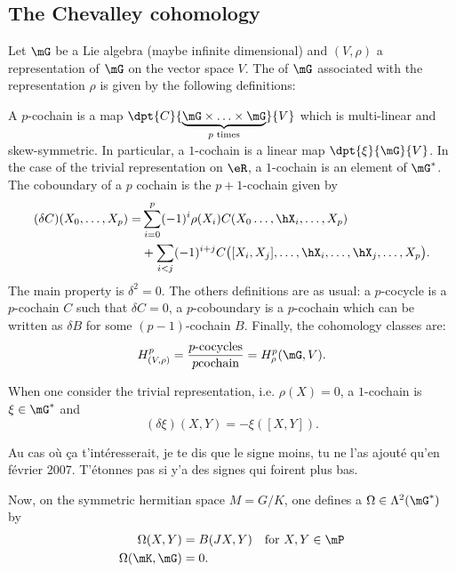 \subsection{The Chevalley cohomology}

Let $\mG$ be a Lie algebra (maybe infinite dimensional) and $(V,\rho)$ a representation of $\mG$ on the vector space $V$. The  of $\mG$ associated with the representation $\rho$ is given by the following definitions:

A $p$-cochain is a map $\dpt{C}{\underbrace{\mG\times\ldots\times\mG}_{p \text{ times}}}{V}$ which is multi-linear and skew-symmetric. In particular, a $1$-cochain is a linear map $\dpt{\xi}{\mG}{V}$. In the case of the trivial representation on $\eR$, a $1$-cochain is an element of $\mG^*$. The coboundary of a $p$ cochain is the $p+1$-cochain given by
\begin{equation}
	\begin{split}
		(\delta C)(X_0,\ldots,X_p)=&\sum_{i=0}^{p}(-1)^i\rho(X_i)C(X_0\ldots,\hX_i,\ldots,X_p)\\
		&+\sum_{i<j}(-1)^{i+j}C\big(  [X_i,X_j],\ldots,\hX_i,\ldots,\hX_j,\ldots,X_p \big).
	\end{split}
\end{equation}
The main property is $\delta^2=0$. The others definitions are as usual: a $p$-cocycle is a $p$-cochain $C$ such that $\delta C=0$, a $p$-coboundary is a $p$-cochain which can be written as $\delta B$ for some  $(p-1)$-cochain $B$. Finally, the cohomology classes are:
\begin{equation}
	H^{p}_{(V,\rho)}=\frac{p\text{-cocycles}}{p\text{cochain}}=H^p_{\rho}(\mG,V).
\end{equation}

When one consider the trivial representation, i.e. $\rho(X)=0$, a $1$-cochain is $\xi\in\mG^*$ and
\begin{equation}  \label{EqDefcochaintrivC}
	(\delta\xi)(X,Y)=-\xi([X,Y]).
\end{equation}

\begin{probleme}
	Au cas où ça t'intéresserait, je te dis que le signe moins, tu ne l'as ajouté qu'en février 2007. T'étonnes pas si y'a des signes qui foirent plus bas.
\end{probleme}

Now, on the symmetric hermitian space $M=G/K$, one defines a $\Omega\in\Lambda^2(\mG^*)$ by
\begin{subequations}
	\begin{align}
		\Omega(X,Y)     & =B(JX,Y)                                            & \text{for }X,Y\in\mP  \label{eq:def_Omega_1} \\
		\Omega(\mK,\mG) & =0.                          \label{eq:def_Omega_2}
	\end{align}
\end{subequations}

